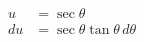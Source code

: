\documentclass[preview]{standalone}
\begin{document}
\begin{align*}
u&=\sec\theta \\ du&=\sec\theta\tan\theta \, d\theta
\end{align*}
\end{document}
